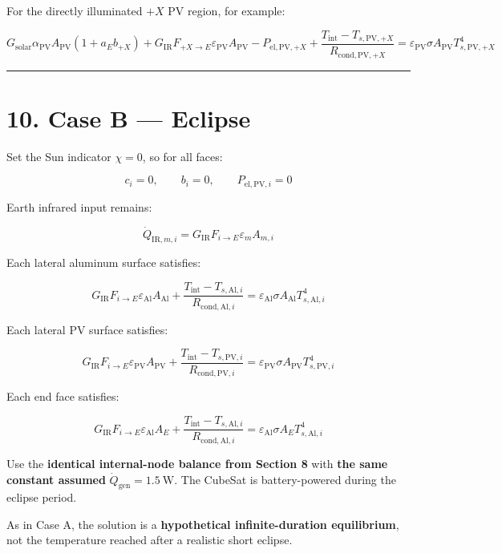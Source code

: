 \documentclass[
]{book}
\begin{document}
For the directly illuminated \(+X\) PV region, for example:

\[
G_{\mathrm{solar}}\alpha_{\mathrm{PV}}A_{\mathrm{PV}}(1+a_Eb_{+X})
+
G_{\mathrm{IR}}F_{+X\to E}\varepsilon_{\mathrm{PV}}A_{\mathrm{PV}}
-
P_{\mathrm{el,PV},+X}
+
\frac{T_{\mathrm{int}}-T_{s,\mathrm{PV},+X}}{R_{\mathrm{cond,PV},+X}}
=
\varepsilon_{\mathrm{PV}}\sigma A_{\mathrm{PV}}T_{s,\mathrm{PV},+X}^{4}
\]

\begin{center}\rule{0.5\linewidth}{0.5pt}\end{center}

\section{10. Case B --- Eclipse}\label{case-b-eclipse}

Set the Sun indicator \(\chi=0\), so for all faces:

\[
c_i=0,\qquad b_i=0,\qquad P_{\mathrm{el,PV},i}=0
\]

Earth infrared input remains:

\[
\dot Q_{\mathrm{IR},m,i}=G_{\mathrm{IR}}F_{i\to E}\varepsilon_m A_{m,i}
\]

Each lateral aluminum surface satisfies:

\[
G_{\mathrm{IR}}F_{i\to E}\varepsilon_{\mathrm{Al}}A_{\mathrm{Al}}
+
\frac{T_{\mathrm{int}}-T_{s,\mathrm{Al},i}}{R_{\mathrm{cond,Al},i}}
=
\varepsilon_{\mathrm{Al}}\sigma A_{\mathrm{Al}}T_{s,\mathrm{Al},i}^{4}
\]

Each lateral PV surface satisfies:

\[
G_{\mathrm{IR}}F_{i\to E}\varepsilon_{\mathrm{PV}}A_{\mathrm{PV}}
+
\frac{T_{\mathrm{int}}-T_{s,\mathrm{PV},i}}{R_{\mathrm{cond,PV},i}}
=
\varepsilon_{\mathrm{PV}}\sigma A_{\mathrm{PV}}T_{s,\mathrm{PV},i}^{4}
\]

Each end face satisfies:

\[
G_{\mathrm{IR}}F_{i\to E}\varepsilon_{\mathrm{Al}}A_E
+
\frac{T_{\mathrm{int}}-T_{s,\mathrm{Al},i}}{R_{\mathrm{cond,Al},i}}
=
\varepsilon_{\mathrm{Al}}\sigma A_E T_{s,\mathrm{Al},i}^{4}
\]

Use the \textbf{identical internal-node balance from Section 8} with \textbf{the same constant assumed} \(\dot Q_{\mathrm{gen}}=1.5\ \mathrm{W}\). The CubeSat is battery-powered during the eclipse period.

As in Case A, the solution is a \textbf{hypothetical infinite-duration equilibrium}, not the temperature reached after a realistic short eclipse.
\end{document}
